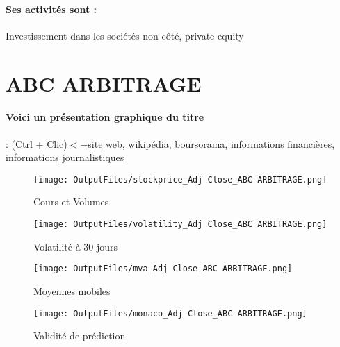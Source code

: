 \documentclass[11pt,a4paper]{report}%
\begin{document}
\paragraph{Ses activités sont : } Investissement dans les sociétés non-côté, private equity 
    
    \newpage

\section{ABC ARBITRAGE}

\paragraph{Voici un présentation graphique du titre} : (Ctrl + Clic)$<-$\href{https://www.abc-arbitrage.com/fr/}{site web}, \href{https://fr.wikipedia.org/wiki/ABC_Arbitrage}{wikipédia}, \href{https://www.boursorama.com/cours/1rPABCA}{boursorama}, \href{https://www.qwant.com/?q=site:https:%2f%2fwww.easybourse.com%2faction-societe%2fABC-ARBITRAGE&t=web&client=ext-firefox-hp}{informations financières}, \href{https://bourse.lerevenu.com/cours-de-bourse/fiche-valeur-synthese/ABC-ARBITRAGE/ABCA-FR}{informations journalistiques}
\begin{figure}[!htb]
   \begin{minipage}{0.5\textwidth}
     \centering
     \texttt{[image: OutputFiles/stockprice\_Adj Close\_ABC ARBITRAGE.png]}
     \caption{Cours et Volumes}\label{Fig:price_ABC ARBITRAGE}
   \end{minipage}\hfill
   \begin{minipage}{0.5\textwidth}
     \centering
     \texttt{[image: OutputFiles/volatility\_Adj Close\_ABC ARBITRAGE.png]}
     \caption{Volatilité à 30 jours}\label{Fig:volat_ABC ARBITRAGE}
   \end{minipage}
\end{figure}
\begin{figure}[!htb]
   \begin{minipage}{0.5\textwidth}
     \centering
     \texttt{[image: OutputFiles/mva\_Adj Close\_ABC ARBITRAGE.png]}
     \caption{Moyennes mobiles}\label{Fig:mva_ABC ARBITRAGE}
   \end{minipage}\hfill
   \begin{minipage}{0.5\textwidth}
     \centering
     \texttt{[image: OutputFiles/monaco\_Adj Close\_ABC ARBITRAGE.png]}
     \caption{Validité de prédiction}\label{Fig:prediction_ABC ARBITRAGE}
   \end{minipage}
\end{figure}
\end{document}
